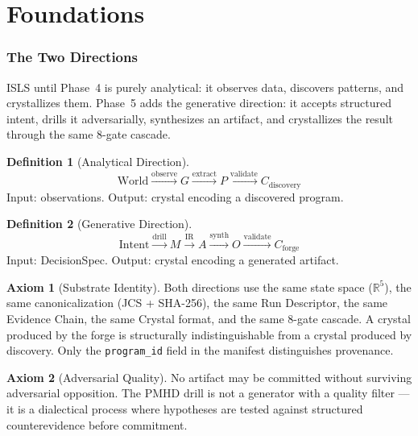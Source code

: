 \documentclass[11pt,a4paper,twoside]{article}
\theoremstyle{definition}
\newtheorem{definition}{Definition}[section]
\newtheorem{axiom}{Axiom}[section]
\theoremstyle{plain}
\theoremstyle{remark}
\newcommand{\ISLS}{\textsf{ISLS}}
\newcommand{\RR}{\mathbb{R}}
\begin{document}
\tableofcontents
\newpage


\part{Foundations}\label{part:foundations}

\section{The Two Directions}\label{sec:twodirections}

\ISLS{} until Phase~4 is purely analytical: it observes data, discovers
patterns, and crystallizes them. Phase~5 adds the generative direction:
it accepts structured intent, drills it adversarially, synthesizes an
artifact, and crystallizes the result through the same 8-gate cascade.

\begin{definition}[Analytical Direction]\label{def:analytical}
\[
  \text{World} \xrightarrow{\text{observe}} G
  \xrightarrow{\text{extract}} P
  \xrightarrow{\text{validate}} C_{\text{discovery}}
\]
Input: observations. Output: crystal encoding a discovered program.
\end{definition}

\begin{definition}[Generative Direction]\label{def:generative}
\[
  \text{Intent} \xrightarrow{\text{drill}} M
  \xrightarrow{\text{IR}} A
  \xrightarrow{\text{synth}} O
  \xrightarrow{\text{validate}} C_{\text{forge}}
\]
Input: DecisionSpec. Output: crystal encoding a generated artifact.
\end{definition}

\begin{axiom}[Substrate Identity]\label{ax:substrate}
Both directions use the same state space ($\RR^5$), the same
canonicalization (JCS + SHA-256), the same Run Descriptor, the same
Evidence Chain, the same Crystal format, and the same 8-gate cascade.
A crystal produced by the forge is structurally indistinguishable from
a crystal produced by discovery. Only the \texttt{program\_id} field
in the manifest distinguishes provenance.
\end{axiom}

\begin{axiom}[Adversarial Quality]\label{ax:adversarial}
No artifact may be committed without surviving adversarial opposition.
The PMHD drill is not a generator with a quality filter --- it is a
dialectical process where hypotheses are tested against structured
counterevidence before commitment.
\end{axiom}
\end{document}
